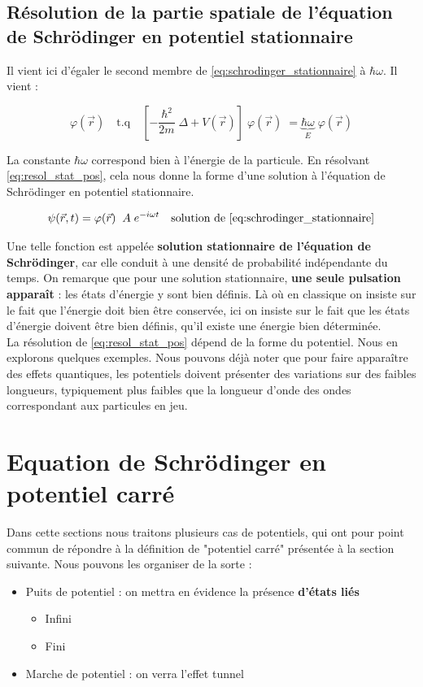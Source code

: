 \documentclass[12pt, a4paper]{book}
\begin{document}
\subsection{Résolution de la partie spatiale de l'équation de Schrödinger en potentiel stationnaire}
Il vient ici d'égaler le second membre de \eqref{eq:schrodinger_stationnaire} à $\hbar \omega$. Il vient :

\begin{equation} \label{eq:resol_stat_pos}
\varphi(\vec r) \quad \mathrm{t.q} \quad \left[-\dfrac{\hbar ^2}{2m} \; \Delta + V(\vec r) \right] \; \varphi(\vec r) \; = \underbrace{\hbar	\omega}_E \; \varphi(\vec r)
\end{equation}


La constante $\hbar \omega$ correspond bien à l'énergie de la particule. En résolvant \eqref{eq:resol_stat_pos}, cela nous donne la forme d'une solution à l'équation de Schrödinger en potentiel stationnaire.

\begin{equation}
\psi(\vec r, t) = \varphi(\vec r) \; \;  A \;e^{-i\omega t} \quad \text{solution de \eqref{eq:schrodinger_stationnaire}}
\end{equation}


Une telle fonction est appelée \textbf{solution stationnaire de l'équation de Schrödinger}, car elle conduit à une densité de probabilité indépendante du temps. On remarque que pour une solution stationnaire, \textbf{une seule pulsation apparaît} : les états d'énergie y sont bien définis. Là où en classique on insiste sur le fait que l'énergie doit bien être conservée, ici on insiste sur le fait que les états d'énergie doivent être bien définis, qu'il existe une énergie bien déterminée. \\

La résolution de \eqref{eq:resol_stat_pos} dépend de la forme du potentiel. Nous en explorons quelques exemples. Nous pouvons déjà noter que pour faire apparaître des effets quantiques, les potentiels doivent présenter des variations sur des faibles longueurs, typiquement plus faibles que la longueur d'onde des ondes correspondant aux particules en jeu.


\section{Equation de Schrödinger en potentiel carré}
Dans cette sections nous traitons plusieurs cas de potentiels, qui ont pour point commun de répondre à la définition de "potentiel carré" présentée à la section suivante. Nous pouvons les organiser de la sorte :
\begin{itemize}
  \item Puits de potentiel : on mettra en évidence la présence \textbf{d'états liés}
    \begin{itemize}[label = $\star$]
      \item Infini
      \item Fini
    \end{itemize}
  \item Marche de potentiel : on verra l'effet tunnel
\end{itemize}
\end{document}
